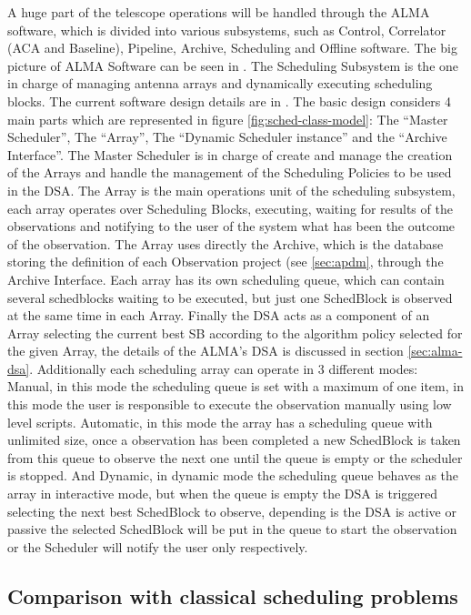 \documentclass[11pt]{article}
\begin{document}
A huge part of the telescope operations will be handled through the ALMA software, which is divided into various subsystems, such as Control, Correlator (ACA and Baseline), Pipeline, Archive, Scheduling and Offline software. The big picture of ALMA Software can be seen in \cite{schwarz04}.
The Scheduling Subsystem is the one in charge of managing antenna arrays and dynamically executing scheduling blocks. The current software design details are in \cite{clarke12}. The basic design considers 4 main parts which are represented in figure \ref{fig:sched-class-model}: The ``Master Scheduler'', The ``Array'', The ``Dynamic Scheduler instance'' and the ``Archive Interface''. The Master Scheduler is in charge of create and manage the creation of the Arrays and handle the management of the Scheduling Policies to be used in the DSA. The Array is the main operations unit of the scheduling subsystem, each array operates over Scheduling Blocks, executing, waiting for results of the observations and notifying to the user of the system what has been the outcome of the observation. The Array uses directly the Archive, which is the database storing the definition of each Observation project (see \ref{sec:apdm}, through the Archive Interface. Each array has its own scheduling queue, which can contain several schedblocks waiting to be executed, but just one SchedBlock is observed at the same time in each Array. Finally the DSA acts as a component of an Array selecting the current best SB according to the algorithm policy selected for the given Array, the details of the ALMA's DSA is discussed in section \ref{sec:alma-dsa}. Additionally each scheduling array can operate in 3 different modes: Manual, in this mode the scheduling queue is set with a maximum of one item, in this mode the user is responsible to execute the observation manually using low level scripts. Automatic, in this mode the array has a scheduling queue with unlimited size, once a observation has been completed a new SchedBlock is taken from this queue to observe the next one until the queue is empty or the scheduler is stopped. And Dynamic, in dynamic mode the scheduling queue behaves as the array in interactive mode, but when the queue is empty the DSA is triggered selecting the next best SchedBlock to observe, depending is the DSA is active or passive the selected SchedBlock will be put in the queue to start the observation or the Scheduler will notify the user only respectively.


\subsection{Comparison with classical scheduling problems}
\end{document}
